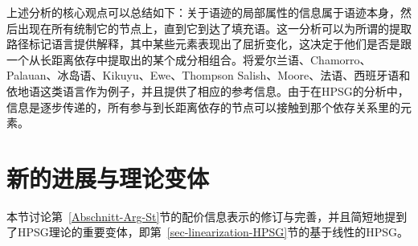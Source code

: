 上述分析的核心观点可以总结如下：关于语迹的局部属性的信息属于语迹本身，然后出现在所有统制它的节点上，直到它到达了填充语。这一分析可以为所谓的提取路径标记语言提供解释，其中某些元素表现出了屈折变化，这决定于他们是否是跟一个从长距离依存中提取出的某个成分相组合。\citet*{BMS2001a}将\label{page-Irish-complementizers}爱尔兰语、Chamorro、Palauan、冰岛语、Kikuyu、Ewe、Thompson Salish、Moore、法语、西班牙语和依地语这类语言作为例子，并且提供了相应的参考信息。由于在HPSG的分析中，信息是逐步传递的，所有参与到长距离依存的节点可以接触到那个依存关系里的元素。

\section{新的进展与理论变体}

本节讨论第~\ref{Abschnitt-Arg-St}节的配价信息表示的修订与完善，并且简短地提到了HPSG理论的重要变体，即第~\ref{sec-linearization-HPSG}节的基于线性的HPSG。

